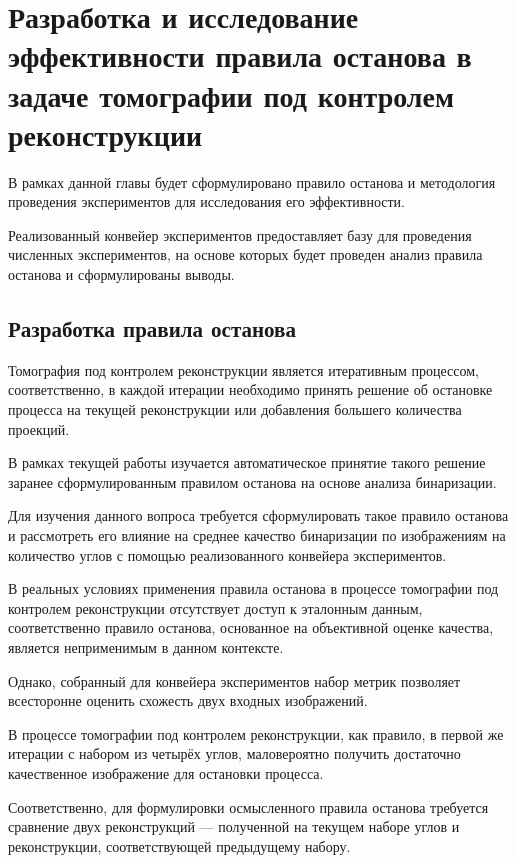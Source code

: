 \section{Разработка и исследование эффективности правила останова в задаче томографии под контролем реконструкции}

В рамках данной главы будет сформулировано правило останова и методология проведения экспериментов для исследования его эффективности.

Реализованный конвейер экспериментов предоставляет базу для проведения численных экспериментов, на основе которых будет проведен анализ правила останова и сформулированы выводы.

\subsection{Разработка правила останова}

Томография под контролем реконструкции является итеративным процессом, соответственно, в каждой итерации необходимо принять решение об остановке процесса на текущей реконструкции или добавления большего количества проекций.

В рамках текущей работы изучается автоматическое принятие такого решение заранее сформулированным правилом останова на основе анализа бинаризации.

Для изучения данного вопроса требуется сформулировать такое правило останова и рассмотреть его влияние на среднее качество бинаризации по изображениям на количество углов с помощью реализованного конвейера экспериментов.

В реальных условиях применения правила останова в процессе томографии под контролем реконструкции отсутствует доступ к эталонным данным, соответственно правило останова, основанное на объективной оценке качества, является неприменимым в данном контексте.

Однако, собранный для конвейера экспериментов набор метрик позволяет всесторонне оценить схожесть двух входных изображений.

В процессе томографии под контролем реконструкции, как правило, в первой же итерации с набором из четырёх углов, маловероятно получить достаточно качественное изображение для остановки процесса. 

Соответственно, для формулировки осмысленного правила останова требуется сравнение двух реконструкций — полученной на текущем наборе углов и реконструкции, соответствующей предыдущему набору. 

